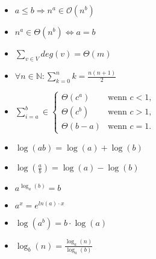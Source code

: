 \documentclass[11pt, a4paper, twoside]{article}
\begin{document}
\begin{multicols}{3}
    \begin{itemize}
        \item $a \leq b \Rightarrow n^a \in \mathcal{O}(n^b)$
        \item $n^a \in \Theta(n^b) \Leftrightarrow a = b$
        \item $\sum_{v \in V}deg(v) = \Theta(m)$
        \item $\forall n \in \mathbb{N}: \sum^n_{k=0}k = \frac{n(n+1)}{2}$
        \item $
            \sum^b_{i=a} \in \begin{cases}
                \Theta(c^a) &\text{wenn } c < 1, \\
                \Theta(c^b) &\text{wenn } c > 1, \\
                \Theta(b-a) &\text{wenn } c = 1.
            \end{cases}
            $
        \item $\log(ab) = \log(a) + \log(b)$
        \item $\log(\frac{a}{b}) = \log(a) - \log(b)$
        \item $a^{\log_a(b)} = b$
        \item $a^x = e^{ln(a) \cdot x}$
        \item $\log(a^b) = b \cdot \log(a)$
        \item $\log_b(n) = \frac{\log_a(n)}{\log_a(b)}$
    \end{itemize}



\end{multicols}
\end{document}
